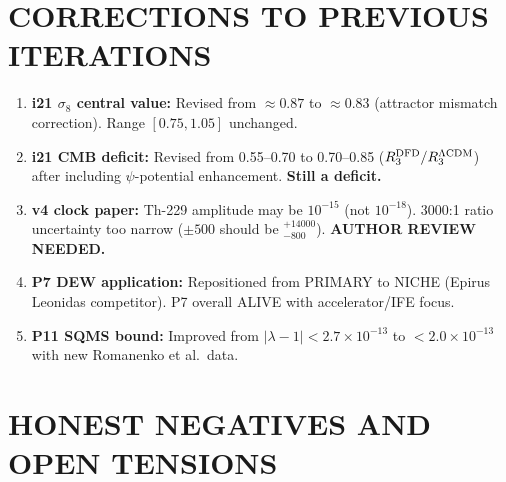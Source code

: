 \documentclass[11pt]{article}
\newcommand{\ee}[1]{\times 10^{#1}}
\begin{document}
\section{CORRECTIONS TO PREVIOUS ITERATIONS}

\begin{enumerate}
\item \textbf{i21 $\sigma_8$ central value:}  Revised from $\approx 0.87$
  to $\approx 0.83$ (attractor mismatch correction).  Range
  $[0.75, 1.05]$ unchanged.

\item \textbf{i21 CMB deficit:}  Revised from 0.55--0.70 to 0.70--0.85
  ($R_3^{\rm DFD}/R_3^{\Lambda\rm CDM}$) after including $\psi$-potential
  enhancement.  \textbf{Still a deficit.}

\item \textbf{v4 clock paper:}  Th-229 amplitude may be $10^{-15}$
  (not $10^{-18}$).  3000:1 ratio uncertainty too narrow ($\pm 500$
  should be $^{+14000}_{-800}$).  \textbf{AUTHOR REVIEW NEEDED.}

\item \textbf{P7 DEW application:}  Repositioned from PRIMARY to NICHE
  (Epirus Leonidas competitor).  P7 overall ALIVE with accelerator/IFE
  focus.

\item \textbf{P11 SQMS bound:}  Improved from $|\lambda-1| < 2.7\ee{-13}$
  to $< 2.0\ee{-13}$ with new Romanenko et al.\ data.
\end{enumerate}


\section{HONEST NEGATIVES AND OPEN TENSIONS}
\end{document}
